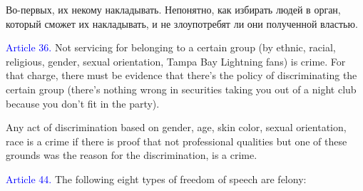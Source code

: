 \documentclass[11pt]{article}
\theoremstyle{remark}
\theoremstyle{definition}
\begin{document}
\color{blue}

Во-первых, их некому накладывать. Непонятно, как избирать людей в орган, который сможет их накладывать, и не злоупотребят ли они полученной властью.


\color{black}






\textcolor{blue}{Article 36.} Not servicing for belonging to a certain group (by ethnic, racial, religious, gender, sexual orientation, Tampa Bay Lightning fans) is crime. For that charge, there must be evidence that there's the policy of discriminating the certain group (there's nothing wrong in securities taking you out of a night club because you don't fit in the party). 

Any act of discrimination based on gender, age, skin color, sexual orientation, race is a crime if there is proof that not professional qualities but one of these grounds was the reason for the discrimination, is a crime.




\textcolor{blue}{Article 44.} The following eight types of freedom of speech are felony:
\end{document}
